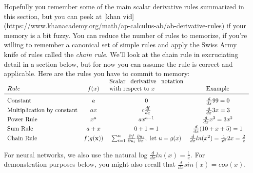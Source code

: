 Hopefully you remember some of the main scalar derivative rules summarized in this section, but you can peek at [khan vid](https://www.khanacademy.org/math/ap-calculus-ab/ab-derivative-rules) if your memory is a bit fuzzy.  You can reduce the number of rules to memorize, if you're willing to remember a canonical set of simple rules and apply the Swiss Army knife of rules called the {\em chain rule}. We'll look at the chain rule in excruciating detail in a section below, but for now you can assume the rule is correct and applicable. Here are the rules you have to commit to memory:

$
\begin{array}{lccc}
Rule & f(x) & \text{\parbox[t][0mm][b]{43mm}{Scalar derivative notation with respect to $x$}} & \text{Example}\\
\\[\dimexpr-\normalbaselineskip+2pt]
\hline
\\[\dimexpr-\normalbaselineskip+5pt]
\vspace{1mm}
\text{Constant} & a & 0 &  \frac{d}{dx}99 = 0\\
\vspace{1mm}
\text{Multiplication by constant} &	ax	&c \frac{df}{dx} & \frac{d}{dx}3x = 3\\
\vspace{1mm}
\text{Power Rule}	& x^a	& ax^{a-1} & \frac{d}{dx}x^3 = 3x^2\\
\vspace{1mm}
\text{Sum Rule}	& a + x	& 0 + 1 = 1  & \frac{d}{dx} (10+x+5) = 1\\
\text{Chain Rule}	 & f(g(\mathbf{x})) &  \sum_{i=1}^n \frac{\partial f}{\partial u_i}\frac{\partial  u_i}{\partial  x}, \text{ let } u=g(x) & \frac{d}{dx} ln(x^2) = \frac{1}{x^2}2x = \frac{2}{x}\\
\end{array}
$

For neural networks, we also use the natural log $\frac{d}{dx} ln(x) = \frac{1}{x}$. For demonstration purposes below, you might also recall that $\frac{d}{dx}sin(x) = cos(x)$.
